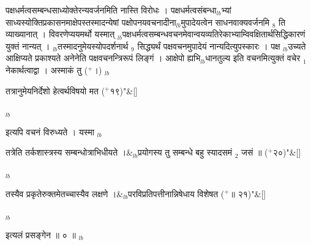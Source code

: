 \documentclass[article,12pt,a4paper]{memoir}%
\newcommand{\add}[1]{($^{+}$#1)}
\newcounter{parCount}
\begin{document}
	  
	  \pstart \leavevmode%
	पक्षधर्मत्वसम्बन्धसाध्योक्तेरन्यवर्जनमिति नास्ति विरोधः । पक्षधर्मत्वसंबन्धा{\tiny $_{lb}$}भ्यां साध्यस्योक्तिप्रकासनमाक्षेपस्तस्मादन्येषां पक्षोपनयवचनादीना{\tiny $_{lb}$}मुपादेयत्वेन साधनवाक्यवर्जनमि {\tiny $_{8}$} \leavevmode{} ति व्याख्यानात् । विवरणेप्ययमर्थो यस्मात् {\tiny $_{lb}$}पक्षधर्मत्वसम्बन्धवचनमेवान्वयव्यतिरेकाभ्याम्विवक्षितार्थसिद्धिकारणं युक्तं नान्यत् । {\tiny $_{lb}$}तस्मादनुमेयस्योपदर्शनार्थ {\tiny $_{9}$} सिद्ध्यर्थं पक्षवचनमुपादेयं नान्यदित्युपस्कारः । पक्ष {\tiny $_{lb}$}उच्यते आक्षिप्यते प्रकाश्यते अनेनेति पक्षवचनन्त्रिरूपं लिङ्गं । आक्षेपो ह्यभि{\tiny $_{lb}$}धानतुल्य इति वचनमित्युक्तं वचेर {\tiny $_{1}$} नेकार्थत्वाद्वा । अस्माकं तु \add{।}
	{}
	\pend%
      {\tiny $_{lb}$}
	  \bigskip
	  \begingroup
	
	    
	    \stanza[\smallbreak]
	  तत्रानुमेयनिर्देशो हेत्वर्थविषयो मत \add{१९}{\normalfontlatin\large\qquad{}"}\&[\smallbreak]
	  
	  
	  
	  \endgroup
	{\tiny $_{lb}$}

	  
	  \pstart \leavevmode%
	इत्यपि वचनं विरुध्यते । यस्मा
	{}
	\pend%
      {\tiny $_{lb}$}
	  \bigskip
	  \begingroup
	
	    
	    \stanza[\smallbreak]
	  तत्रेति तर्कशास्त्रस्य सम्बन्धोत्राभिधीयते ।&{\tiny $_{lb}$}प्रयोगस्य तु सम्बन्धे बहु स्यादसमं {\tiny $_{2}$} जसं ॥ \add{२०}{\normalfontlatin\large\qquad{}"}\&[\smallbreak]
	  
	  
	  
	  \endgroup
	{\tiny $_{lb}$}
	  \bigskip
	  \begingroup
	
	    
	    \stanza[\smallbreak]
	  तस्यैव प्रकृतेरुक्तमेतच्चास्यैव लक्षणे ।&{\tiny $_{lb}$}परविप्रतिपत्तीनान्निषेधाय विशेषत \add{॥ २१}{\normalfontlatin\large\qquad{}"}\&[\smallbreak]
	  
	  
	  
	  \endgroup
	{\tiny $_{lb}$}

	  
	  \pstart \leavevmode%
	इत्यलं प्रसङ्गेन ॥ ० ॥
	{}
	\pend%
      {\tiny $_{lb}$}
\end{document}
